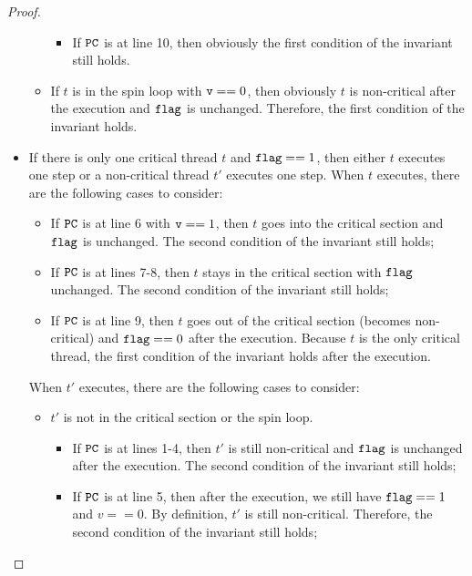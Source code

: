 \documentclass{article}[10pt]
\newcommand{\kwd}[1]{\ensuremath{\text{\ttfamily #1}}\xspace}
\def\kflag{\kwd{flag}}
\def\kv{\kwd{v}}
\begin{document}
\begin{proof}
\begin{itemize}
\begin{itemize}
\begin{itemize}
      \item If \kwd{PC} is at line 10, then obviously the first
        condition of the invariant still holds.

      \end{itemize}


    \item If $t$ is in the spin loop with $\kv == 0$, then obviously
      $t$ is non-critical after the execution and $\kflag$ is
      unchanged. Therefore, the first condition of the invariant
      holds.

    \end{itemize}
    
  \item If there is only one critical thread $t$ and $\kflag == 1$,
    then either $t$ executes one step or a non-critical thread $t'$
    executes one step. When $t$ executes, there are the following
    cases to consider:
    \begin{itemize}
    \item If \kwd{PC} is at line 6 with $\kv == 1$, then $t$ goes into
      the critical section and \kflag is unchanged. The second
      condition of the invariant still holds;

    \item If \kwd{PC} is at lines 7-8, then $t$ stays in the critical
      section with \kflag unchanged. The second condition of the
      invariant still holds;

    \item If \kwd{PC} is at line 9, then $t$ goes out of the critical
      section (becomes non-critical) and $\kflag == 0$ after
      the execution. Because $t$ is the only critical thread, the first
      condition of the invariant holds after the execution.
    \end{itemize}
    When $t'$ executes, there are the following cases to consider:
    \begin{itemize}
    \item $t'$ is not in the critical section or the spin loop. 
      \begin{itemize}
      \item If \kwd{PC} is at lines 1-4, then $t'$ is still
        non-critical and \kflag is unchanged after the execution. The
        second condition of the invariant still holds;

      \item If \kwd{PC} is at line 5, then after the execution, we
        still have $\kflag == 1$ and $v == 0$. By definition, $t'$ is
        still non-critical. Therefore, the second condition of the
        invariant still holds;


\end{itemize}
\end{itemize}
\end{itemize}
\end{proof}
\end{document}
